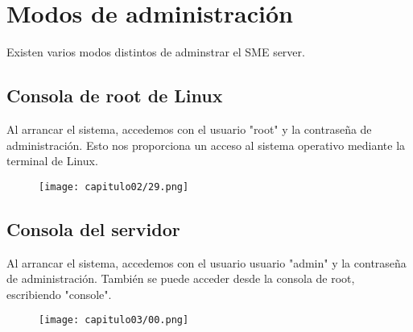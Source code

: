 \section{Modos de administración}

Existen varios modos distintos de adminstrar el SME server.

\subsection{Consola de root de Linux}

Al arrancar el sistema, accedemos con el usuario "root" y la contraseña de administración. Esto nos proporciona un acceso al sistema operativo mediante la terminal de Linux.\\

\begin{figure}[H]
    \centering
    \texttt{[image: capitulo02/29.png]}
\end{figure}

\subsection{Consola del servidor}

Al arrancar el sistema, accedemos con el usuario usuario "admin" y la contraseña de administración. También se puede acceder desde la consola de root, escribiendo "console".\\

\begin{figure}[H]
    \centering
    \texttt{[image: capitulo03/00.png]}
\end{figure}

